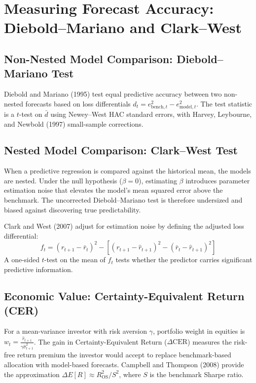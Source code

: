 \section{Measuring Forecast Accuracy: Diebold--Mariano and Clark--West}
\label{sec:05-accuracy}

\subsection{Non-Nested Model Comparison: Diebold--Mariano Test}
Diebold and Mariano (1995) test equal predictive accuracy between two non-nested forecasts based on loss differentials $d_t = e^2_{\text{bench},t} - e^2_{\text{model},t}$. The test statistic is a $t$-test on $\bar{d}$ using Newey--West HAC standard errors, with Harvey, Leybourne, and Newbold (1997) small-sample corrections.

\subsection{Nested Model Comparison: Clark--West Test}
When a predictive regression is compared against the historical mean, the models are nested. Under the null hypothesis ($\beta=0$), estimating $\beta$ introduces parameter estimation noise that elevates the model's mean squared error above the benchmark. The uncorrected Diebold--Mariano test is therefore undersized and biased against discovering true predictability.

Clark and West (2007) adjust for estimation noise by defining the adjusted loss differential:
\begin{equation}
  f_t = (r_{t+1} - \bar r_t)^2 - \left[(r_{t+1} - \hat r_{t+1})^2 - (\bar r_t - \hat r_{t+1})^2\right]
  \label{eq:05-cw}
\end{equation}
A one-sided $t$-test on the mean of $f_t$ tests whether the predictor carries significant predictive information.

\subsection{Economic Value: Certainty-Equivalent Return (CER)}
For a mean-variance investor with risk aversion $\gamma$, portfolio weight in equities is $w_t = \frac{\hat{r}_{t+1}}{\gamma \hat{\sigma}^2_{t+1}}$. The gain in Certainty-Equivalent Return ($\Delta \text{CER}$) measures the risk-free return premium the investor would accept to replace benchmark-based allocation with model-based forecasts. Campbell and Thompson (2008) provide the approximation $\Delta E[R] \approx R^2_{\text{OS}} / S^2$, where $S$ is the benchmark Sharpe ratio.

